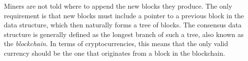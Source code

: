 Miners are not told where to append the new blocks they produce. The only requirement is that new blocks must include a pointer to a previous block in the data structure, 
which then naturally forms a tree of blocks. The consensus data structure is generally defined as the longest branch of such a tree, also known as the \emph{blockchain}. In terms of cryptocurrencies, this means that the only valid currency should be the one that originates from a 
block in the blockchain. 
%
%
%
